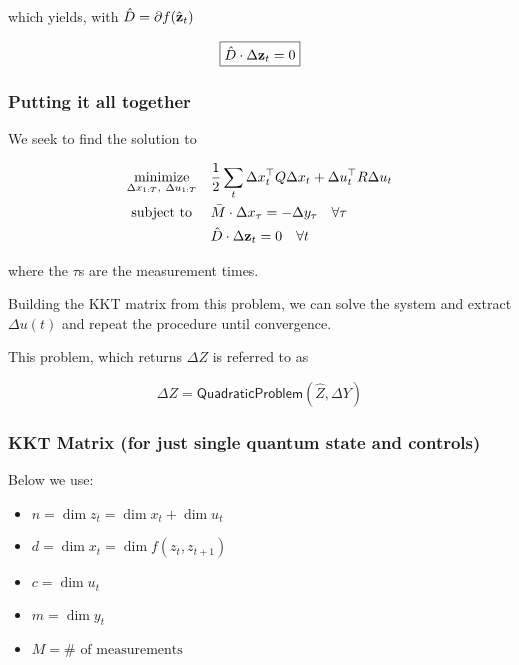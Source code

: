 \documentclass{article}
\begin{document}
which yields, with $\hat D = \partial f(\hat{\vb{z}}_t)$

\begin{equation}
  \boxed{
  \hat D \cdot \Delta {\vb{z}}_t = 0
  }
\end{equation}


\subsubsection*{Putting it all together}

We seek to find the solution to

\begin{align*}
  \underset{\Delta x_{1:T},\ \Delta u_{1:T}}{\text{minimize}} & \quad \frac{1}{2} \sum_t \Delta x^\top_t Q \Delta x_t + \Delta u^\top_t R \Delta u_t \\
  \text{subject to} \ & 
  \quad \bar M \cdot \Delta x_\tau = - \Delta y_\tau \quad \forall \tau \\
  & \quad \hat D \cdot \Delta {\vb{z}}_t = 0 \quad \forall t
\end{align*}


where the $\tau$s are the measurement times.

\hfill


Building the KKT matrix from this problem, we can solve the system and extract $\Delta u(t)$ and repeat the procedure until convergence.

\hfill

This problem, which returns $\Delta Z$ is referred to as 

$$
\boxed{
\Delta Z = \textsf{QuadraticProblem}(\hat Z, \Delta Y)
}
$$

\subsubsection*{KKT Matrix (for just single quantum state and controls)}

Below we use:

\begin{itemize}
  \item $n = \dim z_t = \dim x_t + \dim u_t $ 
  \item $d = \dim x_t = \dim f(z_t, z_{t+1}) $ 
  \item $c = \dim u_t$  
  \item $m = \dim y_t$ 
  \item $M = \#\text{ of measurements}$
\end{itemize}
\end{document}
